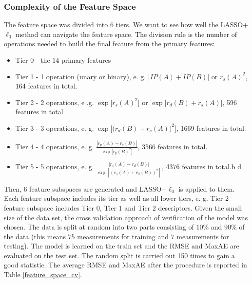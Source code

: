 \documentclass[11pt,oneside,czech,american]{book} %
\theoremstyle{definition} %
\theoremstyle{definition}
\begin{document}
\subsubsection{Complexity of the Feature Space} \label{complexity}
The feature space was divided into 6 tiers. We want to see how well the LASSO+$\ell_{0}$ method can navigate the feature space. The division rule is the number of operations needed to build the final feature from the primary features:
\begin{itemize}
	\item Tier 0 - the 14 primary features
	\item Tier 1 - 1 operation (unary or binary), e. g. $|IP(A)+IP(B)|$ or $r_s(A)^2$, 164 features in total.
	\item Tier 2 - 2 operations, e .g. $\exp\big[r_s(A)^2\big]$ or $ \exp\big[r_d(B) + r_s(A)\big]$, 596 features in total.
	\item Tier 3 - 3 operations, e. g. $\exp\big[\big(r_d(B) + r_s(A)\big)^2 \big]$, 1669 features in total.
	\item Tier 4 - 4 operations, e. g. $\frac{|r_p(A)-r_s(B)|}{\exp\big[r_p(B)^2\big]}$, 3566 features in total.
	\item Tier 5 - 5 operations, e. g. $\frac{|r_s(A)-r_d(B)|}{\exp[(r_s(A)+r_d(B))^2]}$, 4376 features in total.b
	d
\end{itemize}
Then, 6 feature subspaces are generated and LASSO+$\ell_{0}$ is applied to them. Each feature subspace includes its tier as well as all lower tiers, e. g. Tier 2 feature subspace includes Tier 0, Tier 1 and Tier 2 descriptors. Given the small size of the data set, the cross validation approach of verification of the model was chosen. The data is split at random into two parts consisting of 10\% and 90\% of the data (this means 75 measurements for training and 7 measurements for testing). The model is learned on the train set and the RMSE and MaxAE are evaluated on the test set. The random split is carried out 150 times to gain a good statistic. The average RMSE and MaxAE after the procedure is reported in Table \ref{feature_space_cv}.
\end{document}
